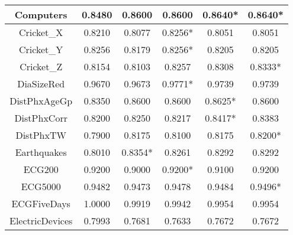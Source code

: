 \documentclass[article]{IEEEtran}
\begin{document}
\begin{table}[]
\begin{adjustbox}{width=1 \linewidth}
\begin{tabularx}{0.62 \textwidth}{|C|C|C|C|C|C|}
    \hline
    Computers & 0.8480 & 0.8600 & 0.8600 & 0.8640* & 0.8640* \\
    \hline
    Cricket\_X & 0.8210 & 0.8077 & 0.8256* & 0.8051 & 0.8051 \\
    \hline
    Cricket\_Y & 0.8256 & 0.8179 & 0.8256* & 0.8205 & 0.8205 \\
    \hline
    Cricket\_Z & 0.8154 & 0.8103 & 0.8257 & 0.8308 & 0.8333* \\
    \hline
    DiaSizeRed & 0.9670 & 0.9673 & 0.9771* & 0.9739 & 0.9739 \\
    \hline
    DistPhxAgeGp & 0.8350 & 0.8600 & 0.8600 & 0.8625* & 0.8600 \\
    \hline
    DistPhxCorr & 0.8200 & 0.8250 & 0.8217 & 0.8417* & 0.8383 \\
    \hline
    DistPhxTW & 0.7900 & 0.8175 & 0.8100 & 0.8175 & 0.8200* \\
    \hline
    Earthquakes & 0.8010 & 0.8354* & 0.8261 & 0.8292 & 0.8292 \\
    \hline
    ECG200 & 0.9200 & 0.9000 & 0.9200* & 0.9100 & 0.9200 \\
    \hline
    ECG5000 & 0.9482 & 0.9473 & 0.9478 & 0.9484 & 0.9496* \\
    \hline
    ECGFiveDays & 1.0000 & 0.9919 & 0.9942 & 0.9954 & 0.9954 \\
    \hline
    ElectricDevices & 0.7993 & 0.7681 & 0.7633 & 0.7672 & 0.7672 \\

\end{tabularx}
\end{adjustbox}
\end{table}
\end{document}
